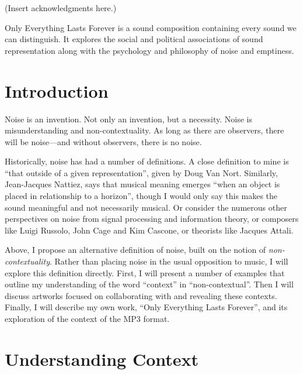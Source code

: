 \documentclass{thesis}
\author{Kyle McDonald}
\begin{document}
 
\titlepage
\tableofcontents
\listoffigures %


(Insert acknowledgments here.)


Only Everything Lasts Forever is a sound composition containing every sound we can distinguish. It explores the social and political associations of sound representation along with the psychology and philosophy of noise and emptiness.

\chapter{Introduction}

Noise is an invention. Not only an invention, but a necessity. Noise is misunderstanding and non-contextuality. As long as there are observers, there will be noise---and without observers, there is no noise.

Historically, noise has had a number of definitions. A close definition to mine is ``that outside of a given representation'', given by Doug Van Nort\cite{Vannort06}. Similarly, Jean-Jacques Nattiez\cite{nattiez_music_1990}, says that musical meaning emerges ``when an object is placed in relationship to a horizon'', though I would only say this makes the sound meaningful and not necessarily musical. Or consider the numerous other perspectives on noise from signal processing and information theory, or composers like Luigi Russolo\cite{Russolo04}, John Cage\cite{Cage61} and Kim Cascone\cite{Cascone00}, or theorists like Jacques Attali\cite{Attali85}.

Above, I propose an alternative definition of noise, built on the notion of \emph{non-contextuality}. Rather than placing noise in the usual opposition to music, I will explore this definition directly. First, I will present a number of examples that outline my understanding of the word ``context'' in ``non-contextual''. Then I will discuss artworks focused on collaborating with and revealing these contexts. Finally, I will describe my own work, ``Only Everything Lasts Forever'', and its exploration of the context of the MP3 format.

\chapter{Understanding Context}
\end{document}
